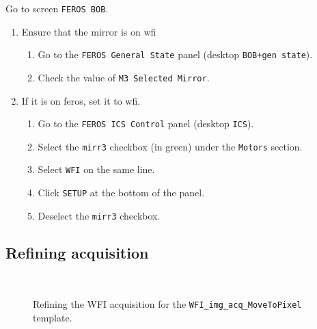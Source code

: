 \documentclass[11pt,fleqn,a4paper]{book}
\begin{document}
\begin{enumerate}
        Go to screen \texttt{FEROS BOB}.
  \begin{enumerate}
      \item Ensure that the mirror is on \gls{wfi}
      \begin{enumerate}
         \item Go to the \texttt{FEROS \gls{General State}} panel (\gls{desktop} \texttt{BOB+gen state}).
         \item Check the value of \texttt{\gls{M3} Selected Mirror}.
      \end{enumerate}
      \item If it is on \gls{feros}, set it to \gls{wfi}.
      \begin{enumerate}
         \item Go to the \texttt{FEROS \gls{ICS Control}} panel (\gls{desktop} \texttt{ICS}).
         \item Select the \texttt{\gls{mirr3}} checkbox (in green) under the \texttt{Motors} section.
         \item Select \texttt{WFI} on the same line.
         \item Click \texttt{SETUP} at the bottom of the panel.
         \item Deselect the \texttt{\gls{mirr3}} checkbox.
      \end{enumerate}  
  \end{enumerate}
\end{enumerate}

\subsection{Refining acquisition}
\label{sec:refinewfi}

\begin{figure*}
\hfill
{}\\
\hfill
{}
\caption[Refining the WFI acquisition]{Refining the WFI \gls{acquisition} for the \texttt{WFI\_img\_acq\_MoveToPixel} \gls{template}.}
\label{fig:refinewfi}
\end{figure*}
\end{document}
